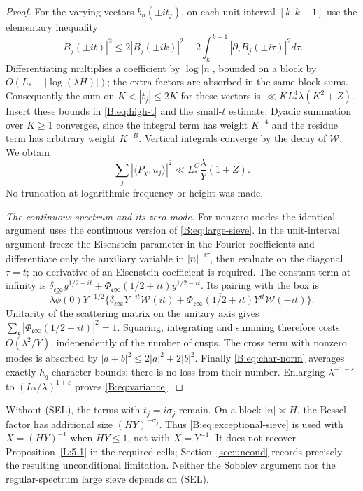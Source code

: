 \begin{proof}
For the varying vectors \(b_n(\pm it_j)\), on each unit interval
\([k,k+1]\) use the elementary inequality
\[
 |B_j(\pm it)|^2\le2|B_j(\pm ik)|^2+
              2\int_k^{k+1}|\partial_\tau B_j(\pm i\tau)|^2d\tau.
\]
Differentiating multiplies a coefficient by \(\log|n|\), bounded on a
block by \(O(L_*+|\log(\lambda H)|)\); the extra factors are absorbed
in the same block sums. Consequently the sum on \(K<|t_j|\le2K\)
for these vectors is \(\ll K L_*^4\lambda(K^2+Z)\).
Insert these bounds in \eqref{B:eq:high-t} and the small-\(t\) estimate.
Dyadic summation over \(K\ge1\) converges, since the integral term has
weight \(K^{-4}\) and the residue term has arbitrary weight \(K^{-B}\).
Vertical integrals converge by the decay of \(\mathcal W\). We obtain
\[
 \sum_j|\langle P_\chi,u_j\rangle|^2
       \ll L_*^C\frac\lambda Y(1+Z).
\]
No truncation at logarithmic frequency or height was made.

\emph{The continuous spectrum and its zero mode.}
For nonzero modes the identical argument uses the continuous version of
\eqref{B:eq:large-sieve}. In the unit-interval argument freeze the
Eisenstein parameter in the Fourier coefficients and differentiate only
the auxiliary variable in \(|n|^{-i\tau}\), then evaluate on the diagonal
\(\tau=t\); no derivative of an Eisenstein coefficient is required.
The constant term at infinity is
\(\delta_{\mathfrak c\infty}y^{1/2+it}
 +\Phi_{\mathfrak c\infty}(1/2+it)y^{1/2-it}\).
Its pairing with the box is
\[
 \lambda\widehat\phi(0)Y^{-1/2}
 \{\delta_{\mathfrak c\infty}Y^{-it}\mathcal W(it)
  +\overline{\Phi_{\mathfrak c\infty}(1/2+it)}Y^{it}\mathcal W(-it)\}.
\]
Unitarity of the scattering matrix on the unitary axis gives
\(\sum_{\mathfrak c}|\Phi_{\mathfrak c\infty}(1/2+it)|^2=1\).
Squaring, integrating and summing therefore costs \(O(\lambda^2/Y)\),
independently of the number of cusps. The cross term with nonzero modes
is absorbed by \(|a+b|^2\le2|a|^2+2|b|^2\).
Finally \eqref{B:eq:char-norm} averages exactly \(h_q\) character bounds;
there is no loss from their number. Enlarging
\(\lambda^{-1-\varepsilon}\) to \((L_*/\lambda)^{1+\varepsilon}\) proves
\eqref{B:eq:variance}.
\end{proof}

Without (SEL), the terms with \(t_j=i\sigma_j\) remain. On a block
\(|n|\asymp H\), the Bessel factor has additional size
\((HY)^{-\sigma_j}\). Thus \eqref{B:eq:exceptional-sieve} is used with
\(X=(HY)^{-1}\) when \(HY\le1\), not with \(X=Y^{-1}\).
It does not recover Proposition~\ref{L:5.1} in the required cells;
Section~\ref{sec:uncond} records precisely the resulting unconditional
limitation. Neither the Sobolev argument nor the regular-spectrum large
sieve depends on (SEL).

